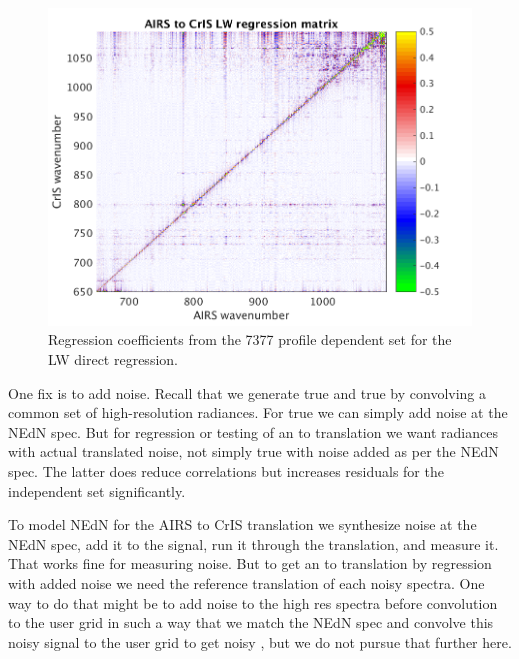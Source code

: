 \documentclass[10pt,twocolumn]{article}
\begin{document}
\begin{figure} %
  \centering
  \includegraphics[width=\linewidth]{figures/LW_dir_regr_mat.png}
  \caption{Regression coefficients from the 7377 profile dependent set for
  the LW direct regression.}
  \label{dreg3}
\end{figure}

One fix is to add noise.  Recall that we generate true {\airs} 
and true {\cris} by convolving a common set of high-resolution
radiances.  For true {\airs} we can simply add noise at the {\airs}
NEdN spec.  But for regression or testing of an {\airs} to {\cris}
translation we want {\cris} radiances with actual translated {\airs}
noise, not simply true {\cris} with noise added as per the {\cris}
NEdN spec.  The latter does reduce correlations but increases
residuals for the independent set significantly.

To model NEdN for the AIRS to CrIS translation we synthesize noise
at the {\airs} NEdN spec, add it to the signal, run it through the
translation, and measure it.  That works fine for measuring noise.
But to get an {\airs} to {\cris} translation by regression with
added noise we need the reference translation of each noisy {\airs}
spectra.  One way to do that might be to add noise to the high res
spectra before convolution to the {\airs} user grid in such a way
that we match the {\airs} NEdN spec and convolve this noisy signal
to the {\cris} user grid to get noisy {\cris}, but we do not pursue
that further here.
\end{document}
